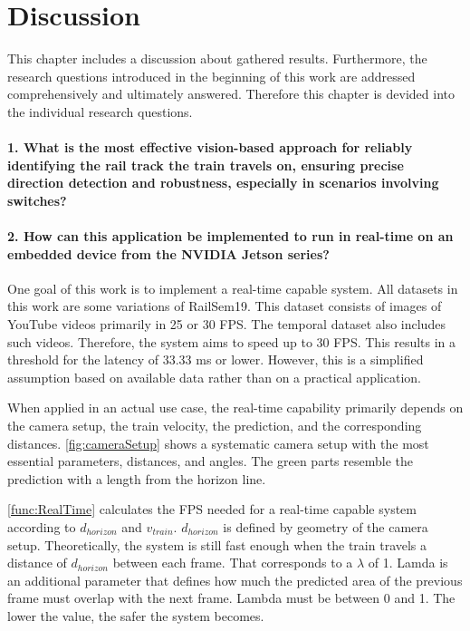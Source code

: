 \chapter{Discussion}
\label{sec:discussion}

This chapter includes a discussion about gathered results.
Furthermore, the research questions introduced in the beginning of this work are addressed comprehensively and ultimately answered.
Therefore this chapter is devided into the individual research questions.

\subsubsection{1. What is the most effective vision-based approach for reliably identifying the rail track the train travels on, ensuring precise direction detection and robustness, especially in scenarios involving switches?}

\subsubsection{2. How can this application be implemented to run in real-time on an embedded device from the NVIDIA Jetson series?}

One goal of this work is to implement a real-time capable system.
All datasets in this work are some variations of RailSem19.
This dataset consists of images of YouTube videos primarily in 25 or 30 \ac{FPS}.
The temporal dataset also includes such videos.
Therefore, the system aims to speed up to 30 \ac{FPS}.
This results in a threshold for the latency of 33.33 ms or lower.
However, this is a simplified assumption based on available data rather than on a practical application.

When applied in an actual use case, the real-time capability primarily depends on the camera setup, the train velocity, the prediction, and the corresponding distances.
\autoref{fig:cameraSetup} shows a systematic camera setup with the most essential parameters, distances, and angles.
The green parts resemble the prediction with a length from the horizon line.

\autoref{func:RealTime} calculates the \ac{FPS} needed for a real-time capable system according to $d_{horizon}$ and $v_{train}$.
$d_{horizon}$ is defined by geometry of the camera setup.
Theoretically, the system is still fast enough when the train travels a distance of $d_{horizon}$ between each frame.
That corresponds to a $\lambda$ of 1.
Lamda is an additional parameter that defines how much the predicted area of the previous frame must overlap with the next frame.
Lambda must be between 0 and 1.
The lower the value, the safer the system becomes.

